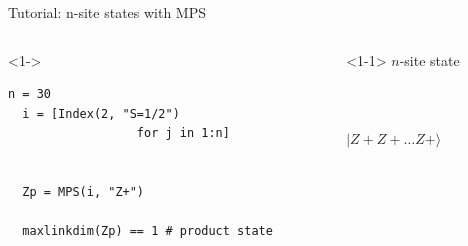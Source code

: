\begin{frame}[fragile]{Tutorial: n-site states with MPS}

\begin{columns}

\begin{column}{4.5cm}

\begin{onlyenv}<1->
\begin{lstlisting}[language=JuliaLocal, style=julia, mathescape, basicstyle=\small]
  n = 30
  i = [Index(2, "S=1/2")
                  for j in 1:n]

  
  Zp = MPS(i, "Z+")

  maxlinkdim(Zp) == 1 # product state
\end{lstlisting}
\end{onlyenv}

\end{column}

\begin{column}{5.5cm}

\begin{onlyenv}<1-1>
\vspace*{-0.1cm}
$n$-site state \\
~\\
~\\
~\\
$|Z+Z+\dots Z+\rangle$ \\
~\\
~\\
\end{onlyenv}


\end{column}
\end{columns}
\end{frame}

